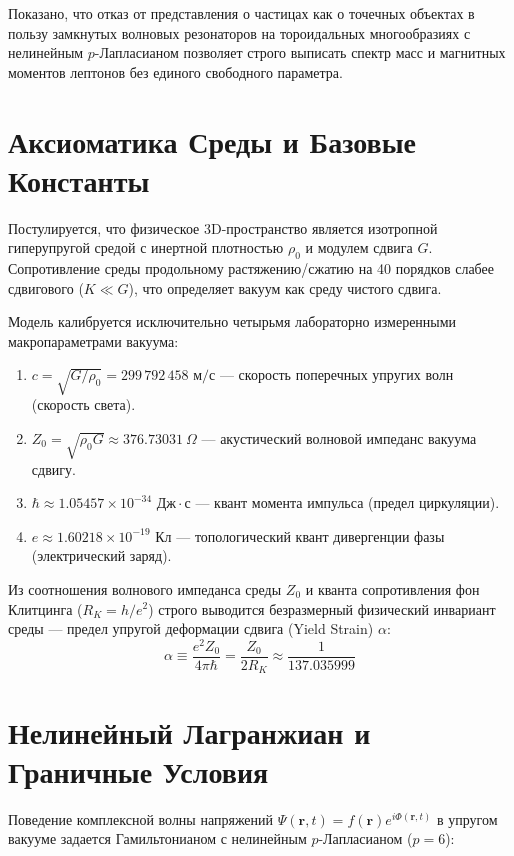 \documentclass[12pt,a4paper]{article}
\begin{document}
	Показано, что отказ от представления о частицах как о точечных объектах в пользу замкнутых волновых резонаторов на тороидальных многообразиях с нелинейным $p$-Лапласианом позволяет строго выписать спектр масс и магнитных моментов лептонов без единого свободного параметра.
	
	\section{Аксиоматика Среды и Базовые Константы}
	Постулируется, что физическое 3D-пространство является изотропной гиперупругой средой с инертной плотностью $\rho_0$ и модулем сдвига $G$. Сопротивление среды продольному растяжению/сжатию на 40 порядков слабее сдвигового ($K \ll G$), что определяет вакуум как среду чистого сдвига.
	
	Модель калибруется исключительно четырьмя лабораторно измеренными макропараметрами вакуума:
	\begin{enumerate}
		\item $c = \sqrt{G/\rho_0} = 299\,792\,458 \text{ м/с}$ — скорость поперечных упругих волн (скорость света).
		\item $Z_0 = \sqrt{\rho_0 G} \approx 376.73031 \ \Omega$ — акустический волновой импеданс вакуума сдвигу.
		\item $\hbar \approx 1.05457 \times 10^{-34} \text{ Дж}\cdot\text{с}$ — квант момента импульса (предел циркуляции).
		\item $e \approx 1.60218 \times 10^{-19} \text{ Кл}$ — топологический квант дивергенции фазы (электрический заряд).
		\end{enumerate}
			
		Из соотношения волнового импеданса среды $Z_0$ и кванта сопротивления фон Клитцинга ($R_K = h/e^2$) строго выводится безразмерный физический инвариант среды — предел упругой деформации сдвига (Yield Strain) $\alpha$:
			\begin{equation}
				\alpha \equiv \frac{e^2 Z_0}{4\pi \hbar} = \frac{Z_0}{2 R_K} \approx \frac{1}{137.035999}
			\end{equation}
			
			\section{Нелинейный Лагранжиан и Граничные Условия}
			Поведение комплексной волны напряжений $\Psi(\mathbf{r}, t) = f(\mathbf{r}) e^{i\Phi(\mathbf{r}, t)}$ в упругом вакууме задается Гамильтонианом с нелинейным $p$-Лапласианом ($p=6$):
			
\end{document}
